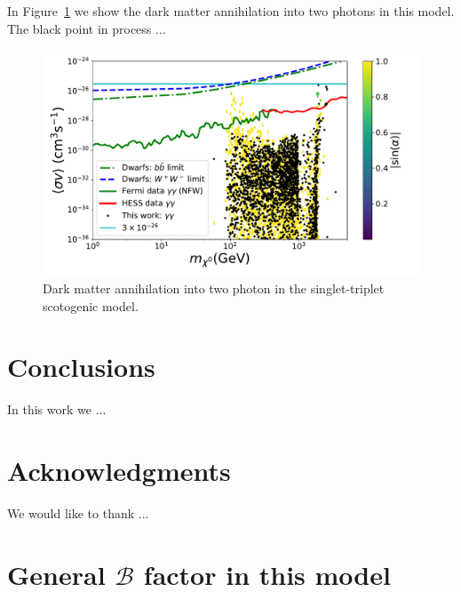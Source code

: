 \documentclass[12pt,letterpaper]{article}
\begin{document}
In Figure~\ref{fig:sigmavgg} we show the dark matter annihilation into two photons in this model.
The black point {\color{red}in process ...}
%
\begin{figure}
\begin{center}
\includegraphics[scale=0.5]{sigmavgg_with_neutrino_physics}
\caption{Dark matter annihilation into two photon in the singlet-triplet scotogenic model.}
\label{fig:sigmavgg}
\end{center}
\end{figure}
%
 
 






 
 
 
 
 
 

\section{Conclusions}
\label{sec:conclusions}

In this work we ...


         

 

\section{Acknowledgments}
We would like to thank ...

\appendix

\section{General $\mathcal{B}$ factor in this model}
\label{app:B-factor}
\end{document}

